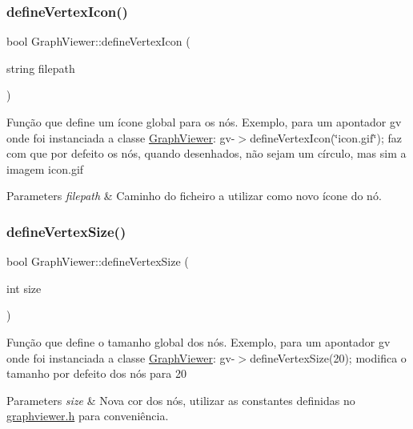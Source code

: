 \subsubsection{\texorpdfstring{define\+Vertex\+Icon()}{defineVertexIcon()}}
{\footnotesize\ttfamily bool Graph\+Viewer\+::define\+Vertex\+Icon (\begin{DoxyParamCaption}\item[{string}]{filepath }\end{DoxyParamCaption})}

Função que define um ícone global para os nós. Exemplo, para um apontador gv onde foi instanciada a classe \hyperlink{class_graph_viewer}{Graph\+Viewer}\+: gv-\/$>$define\+Vertex\+Icon(\char`\"{}icon.\+gif\char`\"{}); faz com que por defeito os nós, quando desenhados, não sejam um círculo, mas sim a imagem icon.\+gif


\begin{DoxyParams}{Parameters}
{\em filepath} & Caminho do ficheiro a utilizar como novo ícone do nó. \\
\hline
\end{DoxyParams}
\mbox{\label{class_graph_viewer_ac4b2a9fec74d38e64088aa79ca4b7d9b}} 
\subsubsection{\texorpdfstring{define\+Vertex\+Size()}{defineVertexSize()}}
{\footnotesize\ttfamily bool Graph\+Viewer\+::define\+Vertex\+Size (\begin{DoxyParamCaption}\item[{int}]{size }\end{DoxyParamCaption})}

Função que define o tamanho global dos nós. Exemplo, para um apontador gv onde foi instanciada a classe \hyperlink{class_graph_viewer}{Graph\+Viewer}\+: gv-\/$>$define\+Vertex\+Size(20); modifica o tamanho por defeito dos nós para 20


\begin{DoxyParams}{Parameters}
{\em size} & Nova cor dos nós, utilizar as constantes definidas no \hyperlink{graphviewer_8h_source}{graphviewer.\+h} para conveniência. \\
\hline
\end{DoxyParams}
\mbox{\label{class_graph_viewer_a3009a66958686ccb7e78b68e37c3c423}} 
